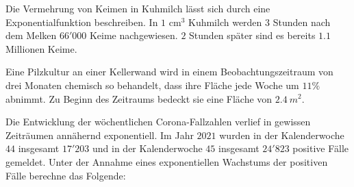 \documentclass[11pt]{exam}
\begin{document}
\begin{questions}
\question[6]
Die Vermehrung von Keimen in Kuhmilch lässt sich durch eine Exponentialfunktion beschreiben. In $1$ cm$^3$ Kuhmilch werden $3$ Stunden nach dem Melken $66'000$ Keime nachgewiesen. $2$ Stunden später sind es bereits $1.1$ Millionen Keime.

\question[4] %
Eine Pilzkultur an einer Kellerwand wird in einem Beobachtungszeitraum von drei Monaten chemisch so behandelt, dass ihre Fläche jede Woche um $11\%$ abnimmt. Zu Beginn des Zeitraums bedeckt sie eine Fläche von $2.4\:m^2$.

\question[6]
Die Entwicklung der wöchentlichen Corona-Fallzahlen verlief in gewissen Zeiträumen annähernd exponentiell. Im Jahr $2021$ wurden in der Kalenderwoche $44$ insgesamt $17'203$ und in der Kalenderwoche $45$ insgesamt $24'823$ positive Fälle gemeldet. Unter der Annahme eines exponentiellen Wachstums der positiven Fälle berechne das Folgende:
\end{questions}
\end{document}
